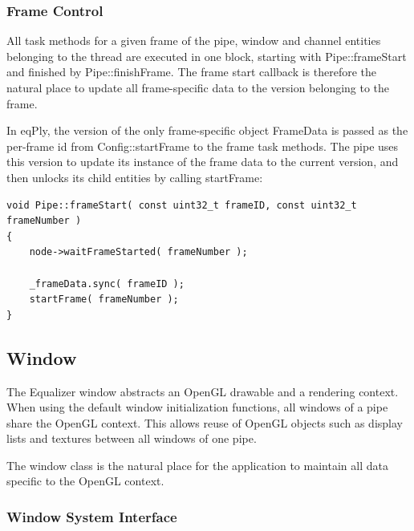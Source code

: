 \documentclass[10pt,a4]{scrartcl}
\begin{document}
\subsubsection{Frame Control}

All task methods for a given frame of the pipe, window and channel
entities belonging to the thread are executed in one block, starting
with \textsf{Pipe::frameStart} and finished by
\textsf{Pipe::finishFrame}. The frame start callback is therefore the
natural place to update all frame-specific data to the version belonging
to the frame. 

In \textsf{eqPly}, the version of the only frame-specific object
\textsf{FrameData} is passed as the per-frame id from
\textsf{Config::startFrame} to the frame task methods. The pipe uses
this version to update its instance of the frame data to the current
version, and then unlocks its child entities by calling
\textsf{startFrame}:

{\footnotesize\begin{lstlisting}
void Pipe::frameStart( const uint32_t frameID, const uint32_t frameNumber )
{
    node->waitFrameStarted( frameNumber );

    _frameData.sync( frameID );
    startFrame( frameNumber );
}
\end{lstlisting}}


\subsection{\label{sEqplyWIndow}Window}

The Equalizer window abstracts an OpenGL drawable and a rendering
context. When using the default window initialization functions, all
windows of a pipe share the OpenGL context. This allows reuse of OpenGL
objects such as display lists and textures between all windows of one
pipe.

The window class is the natural place for the application to maintain
all data specific to the OpenGL context.

\subsubsection{Window System Interface}
\end{document}
